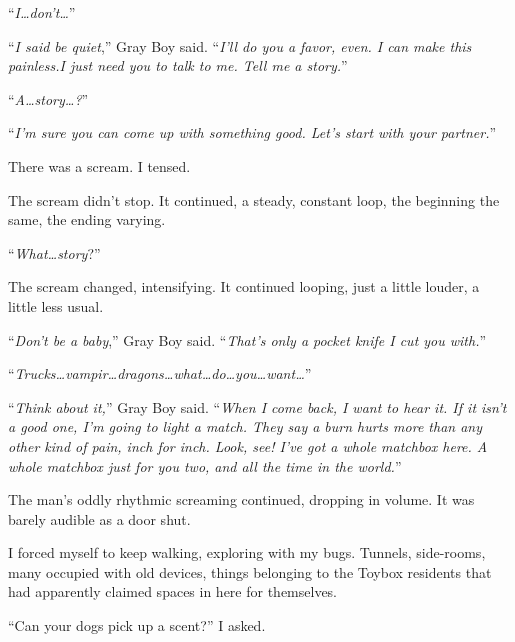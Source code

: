 ``\emph{I\ldots don't\ldots}''



``\emph{I said be quiet},'' Gray Boy said.  ``\emph{I'll do you a favor, even.  I can make this painless.}\emph{I just need you to talk to me.  Tell me a story.}''



``\emph{A\ldots story\ldots?}''



``\emph{I'm sure you can come up with something good.  Let's start with your partner.}''



There was a scream.  I tensed.



The scream didn't stop.  It continued, a steady, constant loop, the beginning the same, the ending varying.



``\emph{What\ldots story}?''



The scream changed, intensifying.  It continued looping, just a little louder, a little less usual.



``\emph{Don't be a baby},'' Gray Boy said.  ``\emph{That's only a pocket knife I cut you with.}''



``\emph{Trucks\ldots vampir\ldots dragons\ldots what\ldots do\ldots you\ldots want\ldots}''



``\emph{Think about it,}'' Gray Boy said.  ``\emph{When I come back, I want to hear it.  If it isn't a good one, I'm going to light a match.  They say a burn hurts more than any other kind of pain, inch for inch.  Look, see!  I've got a whole matchbox here.  A whole matchbox just for you two, and all the time in the world.}''



The man's oddly rhythmic screaming continued, dropping in volume.  It was barely audible as a door shut.



I forced myself to keep walking, exploring with my bugs.  Tunnels, side-rooms, many occupied with old devices, things belonging to the Toybox residents that had apparently claimed spaces in here for themselves.



``Can your dogs pick up a scent?'' I asked.



